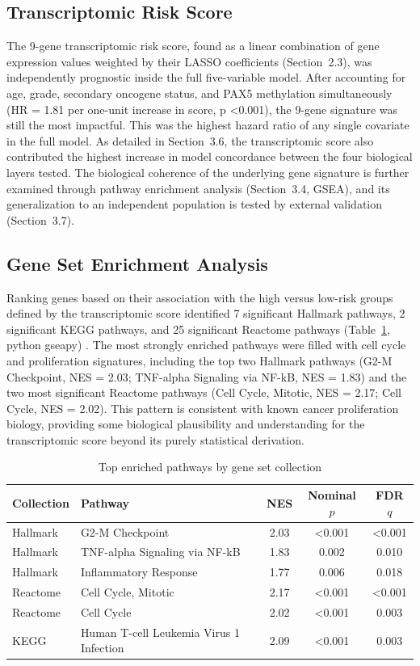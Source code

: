 \documentclass[11pt, letterpaper]{article}
\begin{document}
\subsection{Transcriptomic Risk Score}

The 9-gene transcriptomic risk score, found as a linear combination of gene expression values weighted by their LASSO coefficients (Section~2.3), was independently prognostic inside the full five-variable model. After accounting for age, grade, secondary oncogene status, and PAX5 methylation simultaneously (HR = 1.81 per one-unit increase in score, p \textless 0.001), the 9-gene signature was still the most impactful. This was the highest hazard ratio of any single covariate in the full model. As detailed in Section~3.6, the transcriptomic score also contributed the highest increase in model concordance between the four biological layers tested. The biological coherence of the underlying gene signature is further examined through pathway enrichment analysis (Section~3.4, GSEA), and its generalization to an independent population is tested by external validation (Section~3.7).

\subsection{Gene Set Enrichment Analysis}

Ranking genes based on their association with the high versus low-risk groups defined by the transcriptomic score identified 7 significant Hallmark pathways, 2 significant KEGG pathways, and 25 significant Reactome pathways (Table~\ref{tab:gsea}, python gseapy) \cite{Hallmark2015}. The most strongly enriched pathways were filled with cell cycle and proliferation signatures, including the top two Hallmark pathways (G2-M Checkpoint, NES = 2.03; TNF-alpha Signaling via NF-kB, NES = 1.83) and the two most significant Reactome pathways (Cell Cycle, Mitotic, NES = 2.17; Cell Cycle, NES = 2.02). This pattern is consistent with known cancer proliferation biology, providing some biological plausibility and understanding for the transcriptomic score beyond its purely statistical derivation.

\begin{table}[h!]
\centering
\caption{Top enriched pathways by gene set collection}
\label{tab:gsea}
\begin{tabular}{llccc}
\toprule
Collection & Pathway & NES & Nominal $p$ & FDR $q$ \\
\midrule
Hallmark & G2-M Checkpoint & 2.03 & \textless 0.001 & \textless 0.001 \\
Hallmark & TNF-alpha Signaling via NF-kB & 1.83 & 0.002 & 0.010 \\
Hallmark & Inflammatory Response & 1.77 & 0.006 & 0.018 \\
Reactome & Cell Cycle, Mitotic & 2.17 & \textless 0.001 & \textless 0.001 \\
Reactome & Cell Cycle & 2.02 & \textless 0.001 & 0.003 \\
KEGG & Human T-cell Leukemia Virus 1 Infection & 2.09 & \textless 0.001 & 0.003 \\
\bottomrule
\end{tabular}
\end{table}
\end{document}
